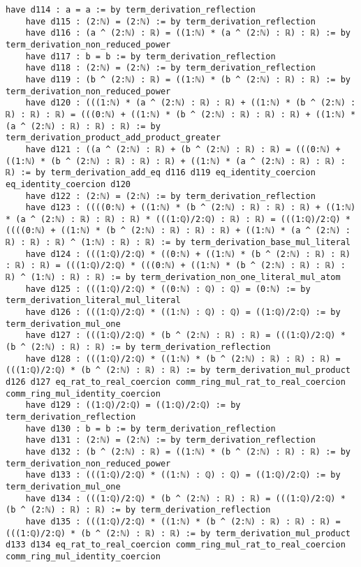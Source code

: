 \documentclass{article}
\begin{document}
\begin{tcolorbox}[colback=white!10, width=\linewidth]
\begin{lstlisting}[language=Lean4]
    have d114 : a = a := by term_derivation_reflection
    have d115 : (2:ℕ) = (2:ℕ) := by term_derivation_reflection
    have d116 : (a ^ (2:ℕ) : ℝ) = ((1:ℕ) * (a ^ (2:ℕ) : ℝ) : ℝ) := by term_derivation_non_reduced_power
    have d117 : b = b := by term_derivation_reflection
    have d118 : (2:ℕ) = (2:ℕ) := by term_derivation_reflection
    have d119 : (b ^ (2:ℕ) : ℝ) = ((1:ℕ) * (b ^ (2:ℕ) : ℝ) : ℝ) := by term_derivation_non_reduced_power
    have d120 : (((1:ℕ) * (a ^ (2:ℕ) : ℝ) : ℝ) + ((1:ℕ) * (b ^ (2:ℕ) : ℝ) : ℝ) : ℝ) = (((0:ℕ) + ((1:ℕ) * (b ^ (2:ℕ) : ℝ) : ℝ) : ℝ) + ((1:ℕ) * (a ^ (2:ℕ) : ℝ) : ℝ) : ℝ) := by term_derivation_product_add_product_greater
    have d121 : ((a ^ (2:ℕ) : ℝ) + (b ^ (2:ℕ) : ℝ) : ℝ) = (((0:ℕ) + ((1:ℕ) * (b ^ (2:ℕ) : ℝ) : ℝ) : ℝ) + ((1:ℕ) * (a ^ (2:ℕ) : ℝ) : ℝ) : ℝ) := by term_derivation_add_eq d116 d119 eq_identity_coercion eq_identity_coercion d120
    have d122 : (2:ℕ) = (2:ℕ) := by term_derivation_reflection
    have d123 : ((((0:ℕ) + ((1:ℕ) * (b ^ (2:ℕ) : ℝ) : ℝ) : ℝ) + ((1:ℕ) * (a ^ (2:ℕ) : ℝ) : ℝ) : ℝ) * (((1:ℚ)/2:ℚ) : ℝ) : ℝ) = (((1:ℚ)/2:ℚ) * ((((0:ℕ) + ((1:ℕ) * (b ^ (2:ℕ) : ℝ) : ℝ) : ℝ) + ((1:ℕ) * (a ^ (2:ℕ) : ℝ) : ℝ) : ℝ) ^ (1:ℕ) : ℝ) : ℝ) := by term_derivation_base_mul_literal
    have d124 : (((1:ℚ)/2:ℚ) * ((0:ℕ) + ((1:ℕ) * (b ^ (2:ℕ) : ℝ) : ℝ) : ℝ) : ℝ) = (((1:ℚ)/2:ℚ) * (((0:ℕ) + ((1:ℕ) * (b ^ (2:ℕ) : ℝ) : ℝ) : ℝ) ^ (1:ℕ) : ℝ) : ℝ) := by term_derivation_non_one_literal_mul_atom
    have d125 : (((1:ℚ)/2:ℚ) * ((0:ℕ) : ℚ) : ℚ) = (0:ℕ) := by term_derivation_literal_mul_literal
    have d126 : (((1:ℚ)/2:ℚ) * ((1:ℕ) : ℚ) : ℚ) = ((1:ℚ)/2:ℚ) := by term_derivation_mul_one
    have d127 : (((1:ℚ)/2:ℚ) * (b ^ (2:ℕ) : ℝ) : ℝ) = (((1:ℚ)/2:ℚ) * (b ^ (2:ℕ) : ℝ) : ℝ) := by term_derivation_reflection
    have d128 : (((1:ℚ)/2:ℚ) * ((1:ℕ) * (b ^ (2:ℕ) : ℝ) : ℝ) : ℝ) = (((1:ℚ)/2:ℚ) * (b ^ (2:ℕ) : ℝ) : ℝ) := by term_derivation_mul_product d126 d127 eq_rat_to_real_coercion comm_ring_mul_rat_to_real_coercion comm_ring_mul_identity_coercion
    have d129 : ((1:ℚ)/2:ℚ) = ((1:ℚ)/2:ℚ) := by term_derivation_reflection
    have d130 : b = b := by term_derivation_reflection
    have d131 : (2:ℕ) = (2:ℕ) := by term_derivation_reflection
    have d132 : (b ^ (2:ℕ) : ℝ) = ((1:ℕ) * (b ^ (2:ℕ) : ℝ) : ℝ) := by term_derivation_non_reduced_power
    have d133 : (((1:ℚ)/2:ℚ) * ((1:ℕ) : ℚ) : ℚ) = ((1:ℚ)/2:ℚ) := by term_derivation_mul_one
    have d134 : (((1:ℚ)/2:ℚ) * (b ^ (2:ℕ) : ℝ) : ℝ) = (((1:ℚ)/2:ℚ) * (b ^ (2:ℕ) : ℝ) : ℝ) := by term_derivation_reflection
    have d135 : (((1:ℚ)/2:ℚ) * ((1:ℕ) * (b ^ (2:ℕ) : ℝ) : ℝ) : ℝ) = (((1:ℚ)/2:ℚ) * (b ^ (2:ℕ) : ℝ) : ℝ) := by term_derivation_mul_product d133 d134 eq_rat_to_real_coercion comm_ring_mul_rat_to_real_coercion comm_ring_mul_identity_coercion

\end{lstlisting}
\end{tcolorbox}
\end{document}
